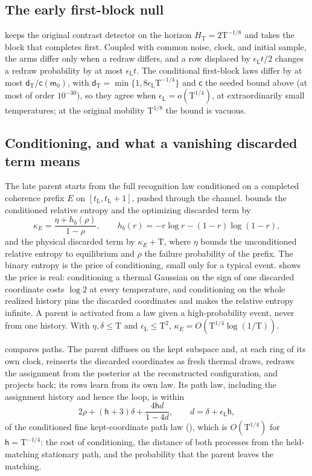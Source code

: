 \subsection{The early first-block null}

 keeps the original contrast detector on the horizon
$H_{\mathrm T}=2\mathrm T^{-1/8}$ and takes the block that completes first. Coupled with common noise,
clock, and initial sample, the arms differ only when a redraw differs, and a row displaced by
$\epsilon_{\mathrm L}t/2$ changes a redraw probability by at most $\epsilon_{\mathrm L}t$. The conditional
first-block laws differ by at most $\mathsf d_{\mathrm T}/\mathsf c(\mathsf m_0)$, with
$\mathsf d_{\mathrm T}=\min\{1,8\epsilon_{\mathrm L}\mathrm T^{-1/4}\}$ and $\mathsf c$ the seeded bound
above (at most of order $10^{-30}$), so they agree when $\epsilon_{\mathrm L}=o(\mathrm T^{1/4})$, at
extraordinarily small temperatures; at the original mobility $\mathrm T^{1/8}$ the bound is vacuous.

\subsection{Conditioning, and what a vanishing discarded term means}

The late parent starts from the full recognition law conditioned on a completed coherence prefix $E$ on
$[t_{\mathrm L},t_{\mathrm L}+1]$, pushed through the channel. 
bounds the conditioned relative entropy and the optimizing discarded term by
\[
\kappa_E=\frac{\eta+h_b(\rho)}{1-\rho},
\qquad
h_b(r)=-r\log r-(1-r)\log(1-r),
\]
and the physical discarded term by $\kappa_E+\mathrm T$, where $\eta$ bounds the unconditioned relative
entropy to equilibrium and $\rho$ the failure probability of the prefix. The binary entropy is the price
of conditioning, small only for a typical event.  shows the price is
real: conditioning a thermal Gaussian on the sign of one discarded coordinate costs $\log2$ at every
temperature, and conditioning on the whole realized history pins the discarded coordinates and makes the
relative entropy infinite. A parent is activated from a law given a high-probability event, never from
one history. With $\eta,\delta\le\mathrm T$ and $\epsilon_{\mathrm L}\le\mathrm T^2$,
$\kappa_E=O(\mathrm T^{1/4}\log(1/\mathrm T))$.

 compares paths. The parent diffuses on the kept subspace and, at each
ring of its own clock, reinserts the discarded coordinates as fresh thermal draws, redraws the assignment
from the posterior at the reconstructed configuration, and projects back; its rows learn from its own law.
Its path law, including the assignment history and hence the loop, is within
\[
2\rho+(\mathsf h+3)\delta+\frac{4\mathsf hd}{1-4d},
\qquad d=\delta+\epsilon_{\mathrm L}\mathsf h,
\]
of the conditioned fine kept-coordinate path law (), which is
$O(\mathrm T^{1/4})$ for $\mathsf h=\mathrm T^{-1/4}$: the cost of conditioning, the distance of both
processes from the held-matching stationary path, and the probability that the parent leaves the matching.

